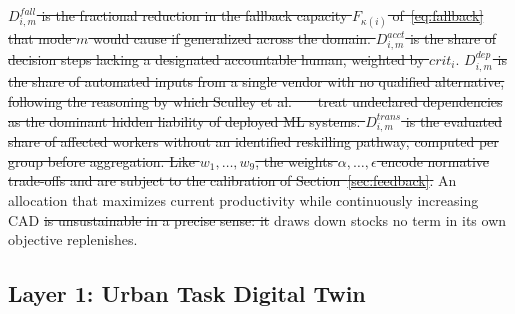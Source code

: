 \documentclass[utf8]{FrontiersinHarvard}
\providecommand{\DIFadd}[1]{{\protect\color{blue}\uwave{#1}}} %
\providecommand{\DIFdel}[1]{{\protect\color{red}\sout{#1}}}                      %
\providecommand{\DIFaddbegin}{} %
\providecommand{\DIFaddend}{} %
\providecommand{\DIFdelbegin}{} %
\providecommand{\DIFdelend}{} %
\begin{document}
\DIFdel{$D^{fall}_{i,m}$ is the fractional reduction in the fallback capacity $F_{\kappa(i)}$ of~\eqref{eq:fallback} that mode $m$ would cause if generalized across the domain. $D^{acct}_{i,m}$ is the share of decision steps lacking a designated accountable human, weighted by $crit_i$}\DIFdelend \DIFaddbegin \DIFadd{alone}\DIFaddend . \DIFdelbegin \DIFdel{$D^{dep}_{i,m}$ is the share of automated inputs from a single vendor with no qualified alternative, following the reasoning by which Sculley et al.~\mbox{%
\cite{Sculley2015} }\hskip0pt%
treat undeclared dependencies as the dominant hidden liability of deployed ML systems. $D^{trans}_{i,m}$ is the evaluated share of affected workers without an identified reskilling pathway, computed per group before aggregation. Like $w_1,\ldots,w_9$, the weights $\alpha,\ldots,\epsilon$ encode normative trade-offs and are subject to the calibration of Section~\ref{sec:feedback}. }\DIFdelend An allocation that maximizes current productivity while continuously increasing CAD \DIFdelbegin \DIFdel{is unsustainable in a precise sense: it }\DIFdelend draws down stocks no term in its own objective replenishes.

	\subsection{Layer 1: Urban Task Digital Twin}
	\label{sec:layer1}
\end{document}
